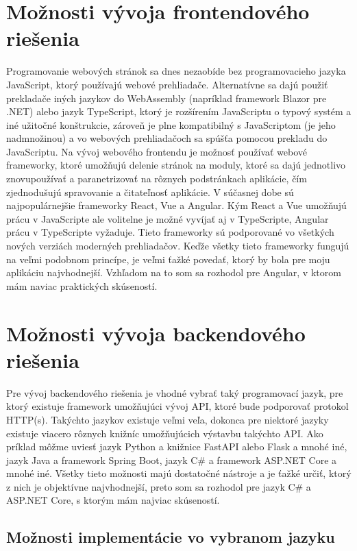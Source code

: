 \section{Možnosti vývoja frontendového riešenia}
Programovanie webových stránok sa dnes nezaobíde bez programovacieho jazyka JavaScript, ktorý používajú webové prehliadače. Alternatívne 
sa dajú použiť prekladače iných jazykov do WebAssembly (napríklad framework Blazor pre .NET) alebo jazyk TypeScript, ktorý je rozšírením JavaScriptu o typový 
systém a iné užitočné konštrukcie, zároveň je plne kompatibilný s JavaScriptom (je jeho nadmnožinou) a vo webových prehliadačoch sa spúšťa pomocou 
prekladu do JavaScriptu. Na vývoj webového frontendu je možnosť používať webové frameworky, ktoré umožňujú delenie stránok na moduly, 
ktoré sa dajú jednotlivo znovupoužívať a paranetrizovať na rôznych podstránkach aplikácie, čím zjednodušujú spravovanie a čitateľnosť aplikácie. 
V súčasnej dobe sú najpopulárnejšie frameworky React, Vue a Angular. Kým React a Vue umožňujú prácu v JavaScripte ale volitelne je možné vyvíjať 
aj v TypeScripte, Angular prácu v TypeScripte vyžaduje. Tieto frameworky sú podporované vo všetkých nových verziách moderných prehliadačov. 
Keďže všetky tieto frameworky fungujú na veľmi podobnom princípe, je veľmi ťažké povedať, ktorý by bola pre moju aplikáciu najvhodnejší. Vzhľadom 
na to som sa rozhodol pre Angular, v ktorom mám naviac praktických skúseností.

\section{Možnosti vývoja backendového riešenia}
Pre vývoj backendového riešenia je vhodné vybrať taký programovací jazyk, pre ktorý existuje framework umožňujúci vývoj API, ktoré bude podporovať 
protokol HTTP(s). Takýchto jazykov existuje veľmi veľa, dokonca pre niektoré jazyky existuje viacero rôznych knižníc umožňujúcich výstavbu 
takýchto API. Ako príklad môžme uviesť jazyk Python a knižnice FastAPI alebo Flask a mnohé iné, jazyk Java a framework Spring Boot, jazyk C\# a 
framework ASP.NET Core a mnohé iné. Všetky tieto možnosti majú dostatočné nástroje a je ťažké určiť, ktorý z nich je objektívne najvhodnejší, 
preto som sa rozhodol pre jazyk C\# a ASP.NET Core, s ktorým mám najviac skúseností.

\subsection{Možnosti implementácie vo vybranom jazyku}